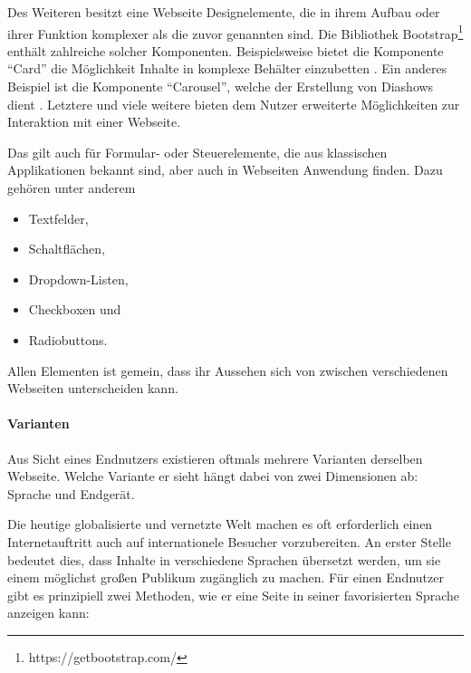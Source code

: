             Des Weiteren besitzt eine Webseite Designelemente,
            die in ihrem Aufbau oder ihrer Funktion komplexer
            als die zuvor genannten sind.
            Die Bibliothek Bootstrap\footnote{https://getbootstrap.com/}
            enthält zahlreiche solcher Komponenten.
            Beispielsweise bietet die Komponente "`Card"' die Möglichkeit
            Inhalte in komplexe Behälter einzubetten \cite{bootstrap:Cards}.
            Ein anderes Beispiel ist die Komponente "`Carousel"',
            welche der Erstellung von Diashows dient \cite{bootstrap:Carousel}.
            Letztere und viele weitere bieten dem Nutzer
            erweiterte Möglichkeiten zur Interaktion mit einer Webseite.

            Das gilt auch für Formular- oder Steuerelemente,
            die aus klassischen Applikationen bekannt sind,
            aber auch in Webseiten Anwendung finden.
            Dazu gehören unter anderem

            \begin{itemize}
                \item Textfelder,
                \item Schaltflächen,
                \item Dropdown-Listen,
                \item Checkboxen und
                \item Radiobuttons.
            \end{itemize}

            Allen Elementen ist gemein, dass ihr Aussehen sich von
            zwischen verschiedenen Webseiten unterscheiden kann.

            \paragraph{Varianten}
            Aus Sicht eines Endnutzers existieren oftmals mehrere
            Varianten derselben Webseite.
            Welche Variante er sieht hängt dabei von zwei Dimensionen ab:
            Sprache und Endgerät.

            Die heutige globalisierte und vernetzte Welt machen es oft erforderlich
            einen Internetauftritt auch auf internationele Besucher vorzubereiten.
            An erster Stelle bedeutet dies, dass Inhalte in verschiedene Sprachen
            übersetzt werden, um sie einem möglichst großen Publikum zugänglich zu machen.
            Für einen Endnutzer gibt es prinzipiell zwei Methoden,
            wie er eine Seite in seiner favorisierten Sprache anzeigen kann:

